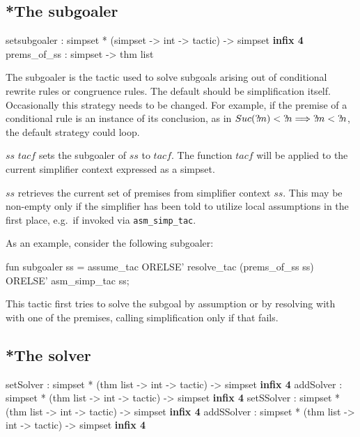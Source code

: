 \subsection{*The subgoaler}\label{sec:simp-subgoaler}
\begin{ttbox}
setsubgoaler : simpset *  (simpset -> int -> tactic) -> simpset \hfill{\bf infix 4}
prems_of_ss  : simpset -> thm list
\end{ttbox}

The subgoaler is the tactic used to solve subgoals arising out of
conditional rewrite rules or congruence rules.  The default should be
simplification itself.  Occasionally this strategy needs to be
changed.  For example, if the premise of a conditional rule is an
instance of its conclusion, as in $Suc({?\!m}) < {?\!n} \Longrightarrow {?\!m}
< {?\!n}$, the default strategy could loop.

\begin{ttdescription}
  
\item[$ss$ \ttindexbold{setsubgoaler} $tacf$] sets the subgoaler of
  $ss$ to $tacf$.  The function $tacf$ will be applied to the current
  simplifier context expressed as a simpset.
  
\item[\ttindexbold{prems_of_ss} $ss$] retrieves the current set of
  premises from simplifier context $ss$.  This may be non-empty only
  if the simplifier has been told to utilize local assumptions in the
  first place, e.g.\ if invoked via \texttt{asm_simp_tac}.

\end{ttdescription}

As an example, consider the following subgoaler:
\begin{ttbox}
fun subgoaler ss =
    assume_tac ORELSE'
    resolve_tac (prems_of_ss ss) ORELSE'
    asm_simp_tac ss;
\end{ttbox}
This tactic first tries to solve the subgoal by assumption or by
resolving with with one of the premises, calling simplification only
if that fails.


\subsection{*The solver}\label{sec:simp-solver}
\begin{ttbox}
setSolver  : simpset * (thm list -> int -> tactic) -> simpset \hfill{\bf infix 4}
addSolver  : simpset * (thm list -> int -> tactic) -> simpset \hfill{\bf infix 4}
setSSolver : simpset * (thm list -> int -> tactic) -> simpset \hfill{\bf infix 4}
addSSolver : simpset * (thm list -> int -> tactic) -> simpset \hfill{\bf infix 4}
\end{ttbox}

